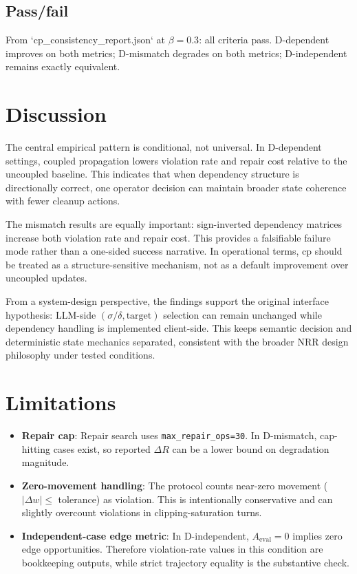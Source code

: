 \documentclass[11pt,a4paper]{article}
\begin{document}
\subsection{Pass/fail}
From `cp\_consistency\_report.json` at \(\beta=0.3\): all criteria pass.
D-dependent improves on both metrics; D-mismatch degrades on both metrics; D-independent remains exactly equivalent.

\section{Discussion}
The central empirical pattern is conditional, not universal. In D-dependent settings, coupled propagation lowers violation rate and repair cost relative to the uncoupled baseline. This indicates that when dependency structure is directionally correct, one operator decision can maintain broader state coherence with fewer cleanup actions.

The mismatch results are equally important: sign-inverted dependency matrices increase both violation rate and repair cost. This provides a falsifiable failure mode rather than a one-sided success narrative. In operational terms, cp should be treated as a structure-sensitive mechanism, not as a default improvement over uncoupled updates.

From a system-design perspective, the findings support the original interface hypothesis: LLM-side \((\sigma/\delta,\text{target})\) selection can remain unchanged while dependency handling is implemented client-side. This keeps semantic decision and deterministic state mechanics separated, consistent with the broader NRR design philosophy under tested conditions.

\section{Limitations}
\begin{itemize}
  \item \textbf{Repair cap}: Repair search uses \texttt{max\_repair\_ops=30}. In D-mismatch, cap-hitting cases exist, so reported \(\Delta R\) can be a lower bound on degradation magnitude.
  \item \textbf{Zero-movement handling}: The protocol counts near-zero movement (\(|\Delta w|\le\) tolerance) as violation. This is intentionally conservative and can slightly overcount violations in clipping-saturation turns.
  \item \textbf{Independent-case edge metric}: In D-independent, \(A_{\text{eval}}=0\) implies zero edge opportunities. Therefore violation-rate values in this condition are bookkeeping outputs, while strict trajectory equality is the substantive check.
\end{itemize}
\end{document}
